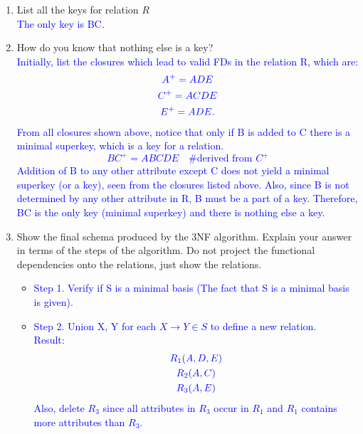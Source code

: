 \documentclass{article}
\begin{document}
\begin{enumerate}
    \begin{enumerate}
        \item List all the keys for relation $R$
        \\
        \textcolor{blue}{The only key is BC.}
        \item How do you know that nothing else is a key?
        \\
        \textcolor{blue}{Initially, list the closures which lead to valid FDs in the relation R, which are: }
        \begin{gather*}
            \textcolor{blue}{A^+ = ADE}\\
            \textcolor{blue}{C^+ = ACDE}\\
            \textcolor{blue}{E^+ = ADE.}
        \end{gather*}
        \textcolor{blue}{From all closures shown above, notice that only if B is added to C there is a minimal superkey, which is a key for a relation.
        \[BC^+ = ABCDE \quad \text{\# derived from $C^+$}\]
        Addition of B to any other attribute except C does not yield a minimal superkey (or a key), seen from the closures listed above. Also, since B is not determined by any other attribute in R, B must be a part of a key. Therefore, BC is the only key (minimal superkey) and there is nothing else a key.}
        \item Show the final schema produced by the 3NF algorithm. Explain your answer in terms of the steps of the algorithm. Do not project the functional dependencies onto the relations, just show the relations.
        \\
        \begin{itemize}[label=\textcolor{blue}{\textbullet}]
            \item \textcolor{blue}{Step 1. } \textcolor{blue}{Verify if S is a minimal basis (The fact that S is a minimal basis is given).}\\
            
            \item \textcolor{blue}{Step 2. } \textcolor{blue}{Union X, Y for each $X \rightarrow Y \in S$ to define a new relation.}\\
            \textcolor{blue}{Result: }
            \begin{gather*}
                \textcolor{blue}{R_1(A, D, E)}\\
                \textcolor{blue}{R_2(A, C)}\\
                \textcolor{blue}{R_3(A, E)}
            \end{gather*}
            \textcolor{blue}{Also, delete $R_3$ since all attributes in $R_3$ occur in $R_1$ and $R_1$ contains more attributes than $R_3$.}\\
            

\end{itemize}
\end{enumerate}
\end{enumerate}
\end{document}
